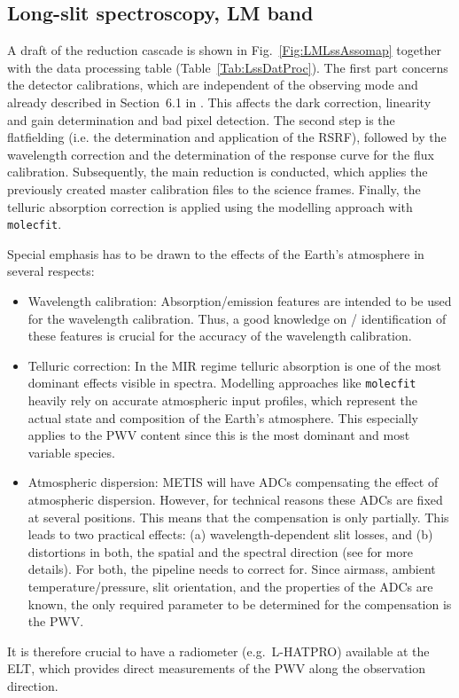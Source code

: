 \subsection{Long-slit spectroscopy, LM band}
\label{ssec:recipes_lss_lm}

A draft of the reduction cascade is shown in
Fig.~\ref{Fig:LMLssAssomap} together with the data processing table
(Table~\ref{Tab:LssDatProc}). The first part concerns the detector
calibrations, which are independent of the observing mode and already
described in Section~6.1 in \cite{DRLS}. This affects the
dark correction, linearity and gain determination and bad pixel
detection. The second step is the flatfielding (i.e. the determination and application of the \ac{RSRF}), followed by the wavelength correction and the determination of the response curve for the flux calibration. Subsequently, the main reduction is conducted, which applies the previously created master calibration files to the science frames. Finally, the telluric absorption correction is applied using the modelling approach with \texttt{molecfit}. 

Special emphasis has to be drawn to the effects of the Earth's
atmosphere in several respects:
\begin{itemize}
\item Wavelength calibration: Absorption/emission features are intended to be
  used for the wavelength calibration. Thus, a good knowledge on /
  identification of these features is crucial for the accuracy of the
  wavelength calibration.
\item Telluric correction: In the MIR regime telluric absorption is
  one of the most dominant effects visible in spectra. Modelling
  approaches like \texttt{molecfit} heavily rely on accurate
  atmospheric input profiles, which represent the actual state and
  composition of the Earth's atmosphere. This especially applies to
  the \ac{PWV} content since this is the most
  dominant and most variable species.
\item Atmospheric dispersion: \ac{METIS} will have \ac{ADC}s compensating the
  effect of atmospheric dispersion. However, for technical reasons
  these ADCs are fixed at several positions. This means that the
  compensation is only partially. This leads to two practical effects:
  (a) wavelength-dependent slit losses, and (b) distortions in both,
  the spatial and the spectral direction (see \cite{METIS-ADC_study}
  for more details). For both, the pipeline needs to correct
  for. Since airmass, ambient temperature/pressure, slit orientation,
  and the properties of the \ac{ADC}s are known, the only required
  parameter to be determined for the compensation is the \ac{PWV}.
\end{itemize}
It is therefore crucial to have a radiometer (e.g.\ L-HATPRO)
available at the \ac{ELT}, which provides direct measurements of the \ac{PWV}
along the observation direction.

